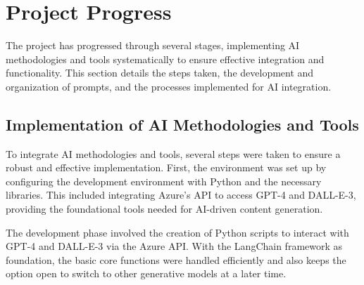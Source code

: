 \documentclass[%
pdftex,
oneside,			%
11pt,				%
parskip=half,		%
headheight = 12pt,	%
headsepline,		%
footsepline,		%
footheight = 16pt,	%
abstracton,		%
DIV=calc,		%
BCOR=8mm,		%
headinclude=false,	%
footinclude=false,	%
listof=totoc,		%
toc=bibliography,	%
]{scrreprt}	%
\begin{document}


    \section{Project Progress}

        The project has progressed through several stages, implementing AI methodologies and tools systematically to ensure effective integration and functionality. 
        This section details the steps taken, the development and organization of prompts, and the processes implemented for AI integration.

        \subsection{Implementation of AI Methodologies and Tools}

            To integrate AI methodologies and tools, several steps were taken to ensure a robust and effective implementation. 
            First, the environment was set up by configuring the development environment with Python and the necessary libraries. 
            This included integrating Azure's API to access GPT-4 and DALL-E-3, providing the foundational tools needed for AI-driven content generation.

            The development phase involved the creation of Python scripts to interact with GPT-4 and DALL-E-3 via the Azure API. 
            With the LangChain framework as foundation, the basic core functions were handled efficiently and also keeps the option open to switch to other generative models at a later time. 
\end{document}
